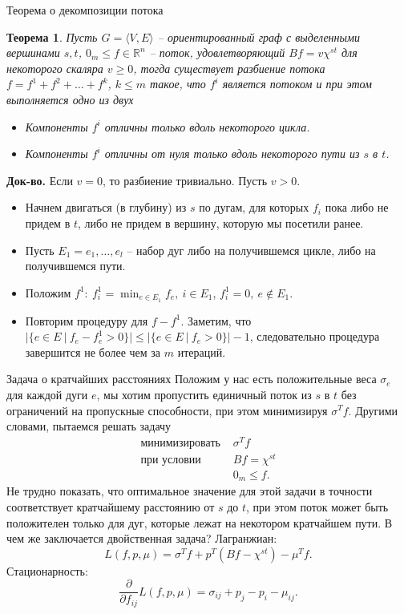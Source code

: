 \documentclass[10pt]{beamer}
\newtheorem{theorem_ru}{Теорема}[]
\begin{document}
\begin{frame}{Теорема о декомпозиции потока}
\begin{theorem_ru}
Пусть $G=\langle V, E\rangle$ -- ориентированный граф с выделенными вершинами $s,t$, $0_m\leq f\in \mathbb{R}^n$ -- поток, удовлетворяющий $Bf=v\chi^{st}$ для некоторого скаляра $v\geq 0$, тогда существует разбиение потока $f=f^1+f^2+\ldots+f^k$, $k\leq m$ такое, что $f^i$ является потоком и при этом выполняется одно из двух
\begin{itemize}
\item Компоненты $f^i$ отличны только вдоль некоторого цикла.
\item Компоненты $f^i$ отличны от нуля только вдоль некоторого пути из $s$ в $t$.
\end{itemize}
\end{theorem_ru}
\textbf{Док-во.} Если $v=0$, то разбиение тривиально. Пусть $v>0$. 
\begin{itemize}
\item
Начнем двигаться (в глубину) из $s$ по дугам, для которых $f_i$ пока либо не придем в $t$, либо не придем в вершину, которую мы посетили ранее. 
\item Пусть $E_1=e_1, \ldots, e_l$ -- набор дуг либо на получившемся цикле, либо на получившемся пути.
\item Положим $f^1:~f^1_i=\min_{e\in E_1}f_e,~i\in E_1$, $f^1_i=0,~e\notin E_1$.
\item Повторим процедуру для $f-f^1$. Заметим, что $|\{e\in E~|~f_e-f^1_e>0\}|\leq|\{e\in E~|~f_e>0\}|-1$, следовательно процедура завершится не более чем за $m$ итераций.
\end{itemize}
\end{frame}

\begin{frame}{Задача о кратчайших расстояниях}
Положим у нас есть положительные веса $\sigma_e$ для каждой дуги $e$, мы хотим пропустить единичный поток из $s$ в $t$ без ограничений на пропускные способности, при этом минимизируя $\sigma^Tf$. Другими словами, пытаемся решать задачу
$$
\begin{array}{ll}
\mbox{минимизировать } & \sigma^Tf \\
\mbox{при условии }    & Bf=\chi^{st} \\
 & 0_m\leq f.
\end{array}
$$
Не трудно показать, что оптимальное значение для этой задачи в точности соответствует кратчайшему расстоянию от $s$ до $t$, при этом поток может быть положителен только для дуг, которые лежат на некотором кратчайшем пути. В чем же заключается двойственная задача? Лагранжиан:
$$
L(f, p, \mu)=\sigma^Tf+p^T(Bf-\chi^{st})-\mu^Tf.
$$
Стационарность:
$$
\frac{\partial}{\partial f_{ij}}L(f,p,\mu)=\sigma_{ij}+p_j-p_i-\mu_{ij}.
$$
\end{frame}
\end{document}
